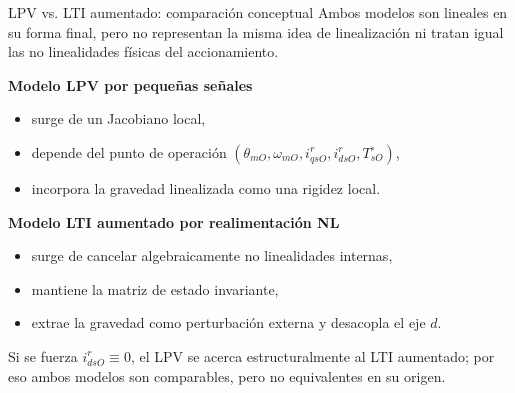 \documentclass[aspectratio=169,t]{beamer}
\begin{document}
\begin{frame}{LPV vs. LTI aumentado: comparación conceptual}
{\small\color{uncGray}Ambos modelos son lineales en su forma final, pero no representan la misma idea de linealización ni tratan igual las no linealidades físicas del accionamiento.}\par
\vspace{3mm}

\textbf{Modelo LPV por pequeñas señales}
\begin{itemize}
  \item surge de un Jacobiano local,
  \item depende del punto de operación $(\theta_{mO},\omega_{mO},i_{qsO}^{r},i_{dsO}^{r},T_{sO}^\circ)$,
  \item incorpora la gravedad linealizada como una rigidez local.
\end{itemize}

\textbf{Modelo LTI aumentado por realimentación NL}
\begin{itemize}
  \item surge de cancelar algebraicamente no linealidades internas,
  \item mantiene la matriz de estado invariante,
  \item extrae la gravedad como perturbación externa y desacopla el eje $d$.
\end{itemize}

{\small Si se fuerza $i_{dsO}^{r}\equiv 0$, el LPV se acerca estructuralmente al LTI aumentado; por eso ambos modelos son comparables, pero no equivalentes en su origen.}
\end{frame}
\end{document}
